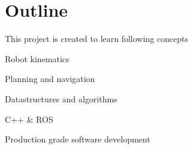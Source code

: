 \hypertarget{index_Outline}{}\section{Outline}\label{index_Outline}
This project is created to learn following concepts
\begin{DoxyEnumerate}
\item Robot kinematics~\newline

\item Planning and navigation~\newline

\item Datastructures and algorithms~\newline

\item C++ \& R\+OS~\newline

\item Production grade software development 
\end{DoxyEnumerate}